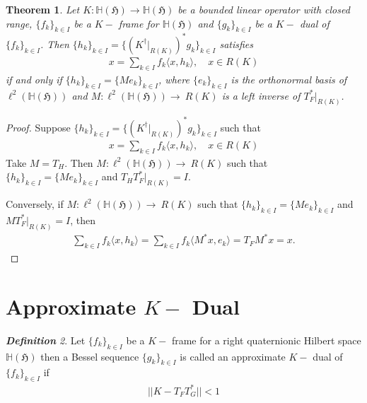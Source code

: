 \documentclass[a4paper,12pt,reqno]{amsart}
\theoremstyle{plain}
\newtheorem{theorem}{\bf Theorem}[section]
\theoremstyle{remark}
\newtheorem{definition}[theorem]{\bf Definition}
\begin{document}
	
	\begin{theorem}
		Let $K:\mathbb{H}(\mathfrak{H})\to\mathbb{H}(\mathfrak{H})$ be a bounded linear operator with closed range, $\{f_k\}_{k\in I}$ be a $K-$ frame for $\mathbb{H}(\mathfrak{H})$ and $\{g_k\}_{k\in I}$ be  a $K-$ dual of $\{f_k\}_{k\in I}$.  Then $\{h_k\}_{k\in I}=\{(K^{\dagger}|_{R(K)})^*g_k\}_{k\in I}$ satisfies 
		\begin{align*}
			x= \sum_{k\in I}f_k\langle x,h_k\rangle, \quad  x\in R(K)   
		\end{align*}
		if and only if $\{h_k\}_{k\in I}=\{Me_k\}_{k\in I}$, where $\{e_k\}_{k\in I}$ is the orthonormal basis of $\ell^2(\mathbb{H}(\mathfrak{H}))$ and $M:\ell^2(\mathbb{H}(\mathfrak{H}))\to\ R(K)$ is a left inverse of $T_F^*|_{R(K)}$.  
	\end{theorem}
	
	\begin{proof}
		Suppose $\{h_k\}_{k\in I}=\{(K^{\dagger}|_{R(K)})^*g_k\}_{k\in I}$  such that
		\begin{align*}
			x= \sum_{k\in I}f_k\langle x,h_k\rangle, \quad  x\in R(K)   
		\end{align*}
		Take $M=T_H$. Then $M:\ell^2(\mathbb{H}(\mathfrak{H}))\to\ R(K) $ such that  $\{h_k\}_{k\in I}=\{Me_k\}_{k\in I}$ and  $T_HT_F^*|_{R(K)}=I$. 
		
		Conversely, if  $M:\ell^2(\mathbb{H}(\mathfrak{H}))\to\ R(K) $ such that  $\{h_k\}_{k\in I}=\{Me_k\}_{k\in I}$ and  $MT_F^*|_{R(K)}=I$, then
		\begin{align*}
			\sum_{k\in I}f_k\langle x, h_k\rangle= \sum_{k\in I}f_k\langle M^*x, e_k\rangle= T_FM^*x=x.
		\end{align*}
		
	\end{proof}
	
	
	
	\section{Approximate $K-$ Dual}
	\begin{definition}
		Let $\{f_k\}_{k\in I}$ be a $K-$ frame for a right quaternionic Hilbert space $\mathbb{H}(\mathfrak{H})$ then a Bessel sequence $\{g_k\}_{k\in I}$ is called an approximate $K-$ dual of $\{f_k\}_{k\in I}$ if 
		\begin{align}
			|| K- T_FT^*_G  || <1
		\end{align}
	\end{definition}
	
\end{document}
